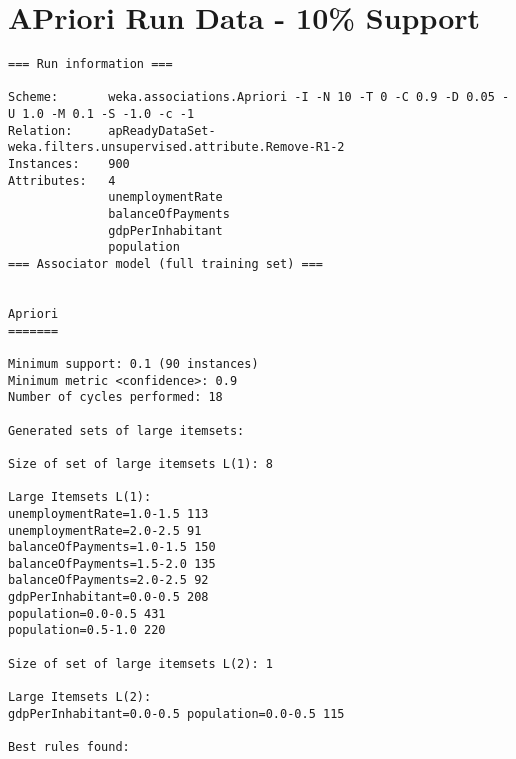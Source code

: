 \section{APriori Run Data - 10\% Support}
\begin{lstlisting}[basicstyle=\footnotesize\ttfamily,numbers=none]
=== Run information ===

Scheme:       weka.associations.Apriori -I -N 10 -T 0 -C 0.9 -D 0.05 -U 1.0 -M 0.1 -S -1.0 -c -1
Relation:     apReadyDataSet-weka.filters.unsupervised.attribute.Remove-R1-2
Instances:    900
Attributes:   4
              unemploymentRate
              balanceOfPayments
              gdpPerInhabitant
              population
=== Associator model (full training set) ===


Apriori
=======

Minimum support: 0.1 (90 instances)
Minimum metric <confidence>: 0.9
Number of cycles performed: 18

Generated sets of large itemsets:

Size of set of large itemsets L(1): 8

Large Itemsets L(1):
unemploymentRate=1.0-1.5 113
unemploymentRate=2.0-2.5 91
balanceOfPayments=1.0-1.5 150
balanceOfPayments=1.5-2.0 135
balanceOfPayments=2.0-2.5 92
gdpPerInhabitant=0.0-0.5 208
population=0.0-0.5 431
population=0.5-1.0 220

Size of set of large itemsets L(2): 1

Large Itemsets L(2):
gdpPerInhabitant=0.0-0.5 population=0.0-0.5 115

Best rules found:
\end{lstlisting}

